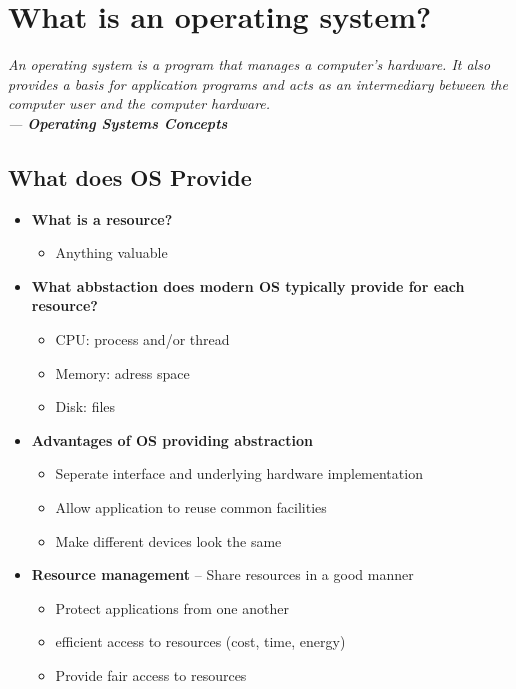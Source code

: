 \documentclass{article}
\begin{document}
\section{What is an operating system?}
\textit{
    An operating system is a program that manages a computer's hardware. It also provides a basis for application programs and acts as an intermediary between 
    the computer user and the computer hardware. \\ 
    --- \textbf{Operating Systems Concepts}
}

\subsection{What does OS Provide}
\begin{itemize}
    \item \textbf{What is a resource?}
        \begin{itemize}[-]
            \item Anything valuable
        \end{itemize}
    \item \textbf{What abbstaction does modern OS typically provide for each resource?}
        \begin{itemize}[-]
            \item CPU: process and/or thread
            \item Memory: adress space
            \item Disk: files
        \end{itemize}
    \item \textbf{Advantages of OS providing abstraction}
        \begin{itemize}[-]
            \item Seperate interface and underlying hardware implementation
            \item Allow application to reuse common facilities
            \item Make different devices look the same
        \end{itemize}
    \item \textbf{\color{red!45!white}Resource management} -- Share resources in a good manner
        \begin{itemize}[-]
            \item Protect applications from one another
            \item efficient access to resources (cost, time, energy)
            \item Provide fair access to resources

\end{itemize}
\end{itemize}
\end{document}
